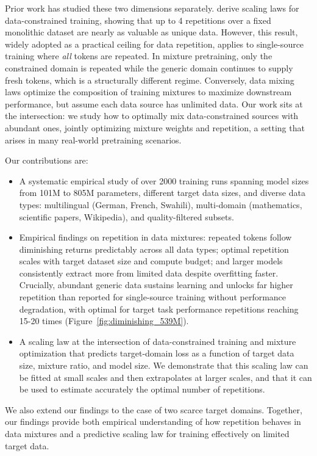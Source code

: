 Prior work has studied these two dimensions separately. 
\citet{muennighoff2023scaling} derive scaling laws for data-constrained training, showing that up to 4 repetitions over a fixed monolithic dataset are nearly as valuable as unique data.
However, this result, widely adopted as a practical ceiling for data repetition, applies to single-source training where \emph{all} tokens are repeated.
In mixture pretraining, only the constrained domain is repeated while the generic domain continues to supply fresh tokens, which is a structurally different regime.
Conversely, data mixing laws \citep{ye2024data, xie2024doremi, shukor2025scalinglawsoptimaldata} optimize the composition of training mixtures to maximize downstream performance, but assume each data source has unlimited data.
Our work sits at the intersection: we study how to optimally mix data-constrained sources with abundant ones, jointly optimizing mixture weights and repetition, a setting that arises in many real-world pretraining scenarios.

Our contributions are:
\begin{itemize}[leftmargin=1.5em]
    \item A systematic empirical study of over 2000 training runs spanning model sizes from 101M to 805M parameters, different target data sizes, and diverse data types: multilingual (German, French, Swahili), multi-domain (mathematics, scientific papers, Wikipedia), and quality-filtered subsets.
    \item Empirical findings on repetition in data mixtures: repeated tokens follow diminishing returns predictably across all data types; optimal repetition scales with target dataset size and compute budget; and larger models consistently extract more from limited data despite overfitting faster. 
    Crucially, abundant generic data sustains learning and unlocks far higher repetition than
    reported for single-source training without performance degradation, with optimal for target task performance repetitions reaching 15-20 times (Figure~\ref{fig:diminishing_539M}).
    \item A scaling law at the intersection of data-constrained training and mixture optimization that predicts target-domain loss as a function of target data size, mixture ratio, and model size. We demonstrate that this scaling law can be fitted at small scales and then extrapolates at larger scales, and that it can be used to estimate accurately the optimal number of repetitions.
\end{itemize}


We also extend our findings to the case of two scarce target domains.
Together, our findings provide both empirical understanding of how repetition behaves in data mixtures and a predictive scaling law for training effectively on limited target data.
